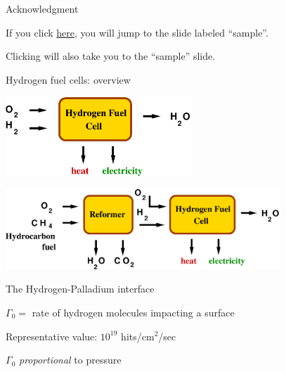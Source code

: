 \documentclass[12pt,a4paper]{beamer}
\begin{document}
\begin{CJK*}{UTF8}{gkai}
\begin{frame}{Acknowledgment}
\bigskip

If you click \hyperlink{sample}{here}, you will jump to the slide
labeled ``sample''.

Clicking \hyperlink{sample}{} will also
take you to the ``sample'' slide.

\bigskip
{} 

\end{frame}

\begin{frame}{Hydrogen fuel cells: overview}
	\begin{center}
  		\includegraphics[height=3.0cm]{figs/schematic1.pdf}
	\end{center}
	\bigskip

	\pause

	\begin{center}
		\includegraphics[height=3.0cm]{figs/schematic2.pdf}
	\end{center}
\end{frame}

\begin{frame}{The Hydrogen-Palladium interface}

$\Gamma_0 = $ rate of hydrogen molecules impacting a surface

Representative value: $10^{19}$ hits/cm$^2$/sec

$\Gamma_0$ \emph{proportional} to pressure

\bigskip


\end{frame}
\end{CJK*}
\end{document}
